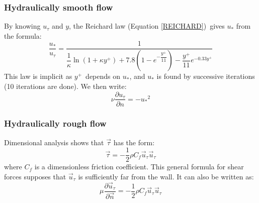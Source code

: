 \subsubsection{Hydraulically smooth flow%
}
By knowing $u_\tau$ and
$y$, the Reichard law (Equation \ref{REICHARD})\ gives $u_*$ from the
formula:
\begin{equation}
  \dfrac{u_*}{u_\tau}=\dfrac{1}{\dfrac{1}{\kappa}\ln(1+\kappa y^{+}%
    )+7.8(1-e^{-\dfrac{y^{+}}{11}})-\dfrac{y^{+}}{11}e^{-0.33y^{+}}}%
\end{equation}
This law is implicit as $y^{+}$\ depends on $u_*$, and $u_*$ is
found by successive iterations (10 iterations are done).
We then write:
\begin{equation}
  \nu\dfrac{\partial u_\tau}{\partial n}=-u_*{}^{2}%
\end{equation}

\subsubsection{Hydraulically rough flow}
Dimensional analysis
shows that $\vec{\tau}$ has the form:
\begin{equation}
\vec{\tau}=-\dfrac{1}{2}\rho C_{f}\vec{u}_\tau\vec{u}_\tau
\end{equation}
where $C_{f}$ is a dimensionless friction
coefficient. This general formula for shear forces supposes that
$\vec{u}_\tau$ is sufficiently far from the wall. It can also be written
as:
\begin{equation}
  \mu\dfrac{\partial\vec{u}_\tau}{\partial \vec{n}}=-\dfrac{1}{2}\rho C_{f}\vec{u}_\tau\vec{u}_\tau%
\end{equation}

